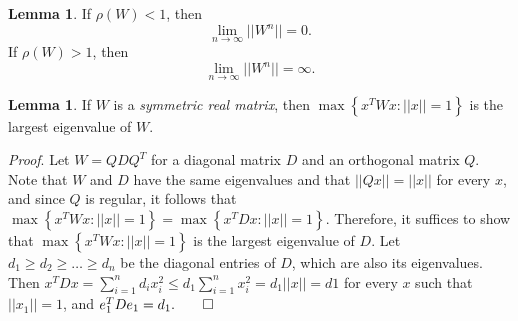 \documentclass[11pt,letterpaper]{article}
\theoremstyle{definition}
\newtheorem{lemma}[theorem]{Lemma}
\begin{document}
\begin{lemma}
If $\rho(W) < 1$, then
\[
\lim_{n\rightarrow \infty} ||W^n|| = 0.
\]
If $\rho(W) > 1$, then
\[
\lim_{n\rightarrow \infty} ||W^n|| = \infty.
\]
\end{lemma}

\begin{lemma}
If $W$ is a \textit{symmetric real matrix}, then $\max \left\{x^TWx : ||x|| = 1 \right\}$ is the largest eigenvalue of $W$.
\end{lemma}

\textit{Proof}. Let $W = QDQ^T$ for a diagonal matrix $D$ and an orthogonal matrix $Q$. Note that $W$ and $D$ have the same eigenvalues and that $||Qx|| = ||x||$ for every $x$, and since $Q$ is regular, it follows that $\max \left\{x^TWx : ||x|| = 1\right\} = \max \left\{x^TDx : ||x|| = 1\right\}$. Therefore, it suffices to show that $\max \left\{x^TWx : ||x|| = 1\right\}$ is the largest eigenvalue of $D$. Let $d_1 \ge d_2 \ge \ldots \ge d_n$ be the diagonal entries of $D$, which are also its eigenvalues. Then $x^TDx = \sum_{i=1}^n d_ix_i^2 \le d_1 \sum_{i=1}^n x_i^2 = d_1 ||x|| = d1$ for every $x$ such that $||x_1|| = 1$, and $e^T_1De_1 = d_1. \qed$
\end{document}
